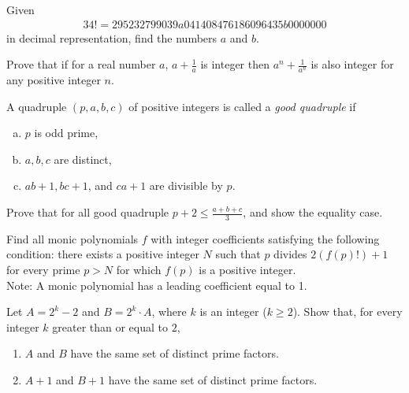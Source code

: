 \begin{problem}
	Given
	\begin{align*}
		34!=295232799039a041408476186096435b0000000
	\end{align*}
	in decimal representation, find the numbers $a$ and $b$. %
\end{problem}

\begin{problem}
	Prove that if for a real number $a $, $a+\frac {1}{a} $ is integer then $a^n+\frac {1}{a^n} $ is also integer for any positive integer $n$. %
\end{problem}

\begin{problem}
	A quadruple $(p,a,b,c)$ of positive integers is called a \textit{good quadruple} if
	\begin{enumerate}[(a)]
		\item $p $ is odd prime,
		\item $a,b,c $ are distinct,
		\item $ab+1,bc+1$, and $ca+1$ are divisible by $p$.
	\end{enumerate}
	Prove that for all good quadruple $p+2\le \frac {a+b+c}{3} $, and show the equality case. %
\end{problem}

\begin{problem}[Balkan 2016]
	Find all monic polynomials $f$ with integer coefficients satisfying the following condition: there exists a positive integer $N$ such that $p$ divides $2(f(p)!)+1$ for every prime $p>N$ for which $f(p)$ is a positive integer.
	\\
	Note: A monic polynomial has a leading coefficient equal to 1. %
\end{problem}

\begin{problem}
	Let $A=2^k - 2$ and $B= 2^k \cdot A$, where $k$ is an integer ($k \ge 2$).
	Show that, for every integer $k$ greater than or equal to $2$,
	\begin{enumerate}
		\item $A$ and $B$ have the same set of distinct prime factors.
		\item $A+1$ and $B+1$ have the same set of distinct prime factors.
	\end{enumerate}
\end{problem}

